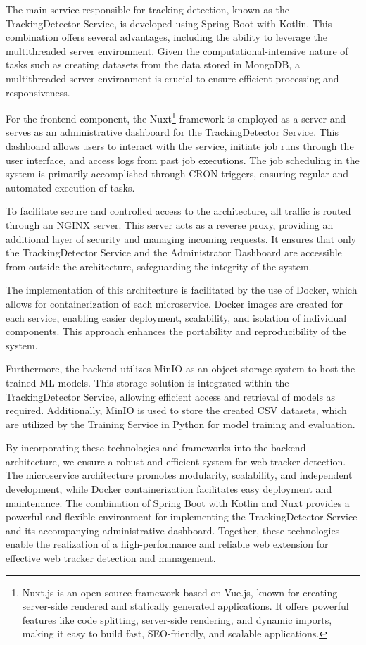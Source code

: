 The main service responsible for tracking detection, known as the TrackingDetector Service, is developed using Spring Boot
with Kotlin. This combination offers several advantages, including the ability to leverage the multithreaded server environment.
Given the computational-intensive nature of tasks such as creating datasets from the data stored in MongoDB, a multithreaded
server environment is crucial to ensure efficient processing and responsiveness.

For the frontend component, the Nuxt\footnote{Nuxt.js is an open-source framework based on Vue.js, known for creating server-side rendered and statically generated applications. It offers powerful features like code splitting, server-side rendering, and dynamic imports, making it easy to build fast, SEO-friendly, and scalable applications.} framework is employed as a server and serves as an administrative dashboard
for the TrackingDetector Service. This dashboard allows users to interact with the service, initiate job runs through
the user interface, and access logs from past job executions. The job scheduling in the system is primarily accomplished
through CRON triggers, ensuring regular and automated execution of tasks.

To facilitate secure and controlled access to the architecture, all traffic is routed through an NGINX server. This server
acts as a reverse proxy, providing an additional layer of security and managing incoming requests. It ensures that only
the TrackingDetector Service and the Administrator Dashboard are accessible from outside the architecture, safeguarding the integrity
of the system.

The implementation of this architecture is facilitated by the use of Docker, which allows for containerization of each microservice.
Docker images are created for each service, enabling easier deployment, scalability, and isolation of individual components.
This approach enhances the portability and reproducibility of the system.

Furthermore, the backend utilizes MinIO as an object storage system to host the trained ML models. This storage solution
is integrated within the TrackingDetector Service, allowing efficient access and retrieval of models as required. Additionally,
MinIO is used to store the created CSV datasets, which are utilized by the Training Service in Python for model training and evaluation.

By incorporating these technologies and frameworks into the backend architecture, we ensure a robust and efficient system
for web tracker detection. The microservice architecture promotes modularity, scalability, and independent development,
while Docker containerization facilitates easy deployment and maintenance. The combination of Spring Boot with Kotlin and Nuxt
provides a powerful and flexible environment for implementing the TrackingDetector Service and its accompanying administrative dashboard. Together, these technologies enable the realization of a high-performance and reliable web extension for effective web tracker detection and management.

